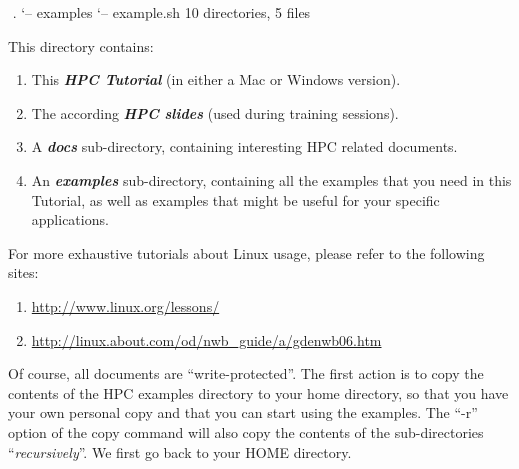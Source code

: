 \begin{prompt}
$ %
$ %
.
`-- examples
    `-- example.sh
10 directories, 5 files
\end{prompt}

This directory contains:

\begin{enumerate}
  \item This \textbf{\textit{HPC Tutorial}} (in either a Mac or Windows
    version).
  \item The according \textbf{\textit{HPC slides}} (used during training
    sessions).
  \item A \textbf{\textit{docs}} sub-directory, containing interesting HPC
    related documents.
  \item An \textbf{\textit{examples}} sub-directory, containing all the
    examples that you need in this Tutorial, as well as examples that might be
    useful for your specific applications.
\end{enumerate}

\textbf{} For more exhaustive tutorials about Linux usage,
please refer to the following sites:

\begin{enumerate}
  \item \url{http://www.linux.org/lessons/}
  \item \url{http://linux.about.com/od/nwb\_guide/a/gdenwb06.htm}
\end{enumerate}

Of course, all documents are ``write-protected''. The first action is to copy
the contents of the HPC examples directory to your home directory, so that you
have your own personal copy and that you can start using the examples. The
``-r'' option of the copy command will also copy the contents of the
sub-directories ``\textit{recursively}''.  We first go back to your HOME
directory.

\begin{prompt}
$ %
$ %
\end{prompt}

